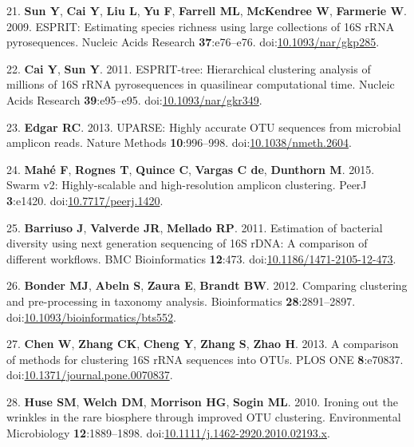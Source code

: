 \documentclass[11pt,]{article}
\begin{document}
\hypertarget{ref-Sun2009}{}
21. \textbf{Sun Y}, \textbf{Cai Y}, \textbf{Liu L}, \textbf{Yu F},
\textbf{Farrell ML}, \textbf{McKendree W}, \textbf{Farmerie W}. 2009.
ESPRIT: Estimating species richness using large collections of 16S rRNA
pyrosequences. Nucleic Acids Research \textbf{37}:e76--e76.
doi:\href{https://doi.org/10.1093/nar/gkp285}{10.1093/nar/gkp285}.

\hypertarget{ref-Cai2011}{}
22. \textbf{Cai Y}, \textbf{Sun Y}. 2011. ESPRIT-tree: Hierarchical
clustering analysis of millions of 16S rRNA pyrosequences in quasilinear
computational time. Nucleic Acids Research \textbf{39}:e95--e95.
doi:\href{https://doi.org/10.1093/nar/gkr349}{10.1093/nar/gkr349}.

\hypertarget{ref-Edgar2013}{}
23. \textbf{Edgar RC}. 2013. UPARSE: Highly accurate OTU sequences from
microbial amplicon reads. Nature Methods \textbf{10}:996--998.
doi:\href{https://doi.org/10.1038/nmeth.2604}{10.1038/nmeth.2604}.

\hypertarget{ref-Mah2015}{}
24. \textbf{Mahé F}, \textbf{Rognes T}, \textbf{Quince C},
\textbf{Vargas C de}, \textbf{Dunthorn M}. 2015. Swarm v2:
Highly-scalable and high-resolution amplicon clustering. PeerJ
\textbf{3}:e1420.
doi:\href{https://doi.org/10.7717/peerj.1420}{10.7717/peerj.1420}.

\hypertarget{ref-Barriuso2011}{}
25. \textbf{Barriuso J}, \textbf{Valverde JR}, \textbf{Mellado RP}.
2011. Estimation of bacterial diversity using next generation sequencing
of 16S rDNA: A comparison of different workflows. BMC Bioinformatics
\textbf{12}:473.
doi:\href{https://doi.org/10.1186/1471-2105-12-473}{10.1186/1471-2105-12-473}.

\hypertarget{ref-Bonder2012}{}
26. \textbf{Bonder MJ}, \textbf{Abeln S}, \textbf{Zaura E},
\textbf{Brandt BW}. 2012. Comparing clustering and pre-processing in
taxonomy analysis. Bioinformatics \textbf{28}:2891--2897.
doi:\href{https://doi.org/10.1093/bioinformatics/bts552}{10.1093/bioinformatics/bts552}.

\hypertarget{ref-Chen2013}{}
27. \textbf{Chen W}, \textbf{Zhang CK}, \textbf{Cheng Y}, \textbf{Zhang
S}, \textbf{Zhao H}. 2013. A comparison of methods for clustering 16S
rRNA sequences into OTUs. PLOS ONE \textbf{8}:e70837.
doi:\href{https://doi.org/10.1371/journal.pone.0070837}{10.1371/journal.pone.0070837}.

\hypertarget{ref-Huse2010}{}
28. \textbf{Huse SM}, \textbf{Welch DM}, \textbf{Morrison HG},
\textbf{Sogin ML}. 2010. Ironing out the wrinkles in the rare biosphere
through improved OTU clustering. Environmental Microbiology
\textbf{12}:1889--1898.
doi:\href{https://doi.org/10.1111/j.1462-2920.2010.02193.x}{10.1111/j.1462-2920.2010.02193.x}.
\end{document}
